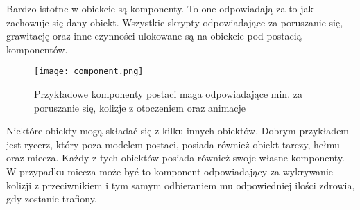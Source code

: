 Bardzo istotne w obiekcie są komponenty. To one odpowiadają za to jak zachowuje się dany obiekt. Wszystkie skrypty odpowiadające za poruszanie się, grawitację oraz inne czynności ulokowane są na obiekcie pod postacią komponentów.

\begin{figure}[H]
	\center
	\texttt{[image: component.png]}
	\caption{Przykładowe komponenty postaci maga odpowiadające min. za poruszanie się, kolizje z otoczeniem oraz animacje}
\end{figure}



Niektóre obiekty mogą składać się z kilku innych obiektów. Dobrym przykładem jest rycerz, który poza modelem postaci, posiada również obiekt tarczy, hełmu oraz miecza. Każdy z tych obiektów posiada również swoje własne komponenty. W przypadku miecza może być to komponent odpowiadający za wykrywanie kolizji z przeciwnikiem i tym samym odbieraniem mu odpowiedniej ilości zdrowia, gdy zostanie trafiony.
